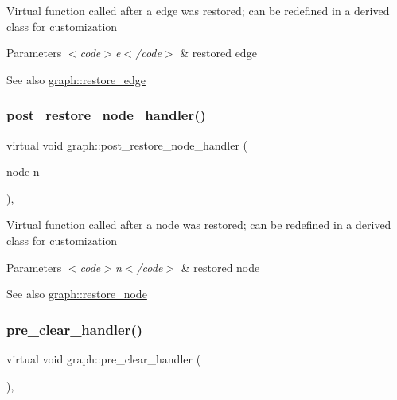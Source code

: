 Virtual function called after a edge was restored; can be redefined in a derived class for customization


\begin{DoxyParams}{Parameters}
{\em $<$code$>$e$<$/code$>$} & restored edge \\
\hline
\end{DoxyParams}
\begin{DoxySeeAlso}{See also}
\mbox{\hyperlink{classgraph_a2e5426682a0897b9f9104b019970bedc}{graph\+::restore\+\_\+edge}} 
\end{DoxySeeAlso}
\mbox{\label{classgraph_ad0fd5fc9618111890b596601b6273713}} 
\subsubsection{\texorpdfstring{post\+\_\+restore\+\_\+node\+\_\+handler()}{post\_restore\_node\_handler()}}
{\footnotesize\ttfamily virtual void graph\+::post\+\_\+restore\+\_\+node\+\_\+handler (\begin{DoxyParamCaption}\item[{\mbox{\hyperlink{classnode}{node}}}]{n }\end{DoxyParamCaption})\hspace{0.3cm}{\ttfamily [inline]}, {\ttfamily [virtual]}}

Virtual function called after a node was restored; can be redefined in a derived class for customization


\begin{DoxyParams}{Parameters}
{\em $<$code$>$n$<$/code$>$} & restored node \\
\hline
\end{DoxyParams}
\begin{DoxySeeAlso}{See also}
\mbox{\hyperlink{classgraph_ab57aab79e649cc275052b7decbdd03ec}{graph\+::restore\+\_\+node}} 
\end{DoxySeeAlso}
\mbox{\label{classgraph_a16ccad78837d16be59854549cd2d847a}} 
\subsubsection{\texorpdfstring{pre\+\_\+clear\+\_\+handler()}{pre\_clear\_handler()}}
{\footnotesize\ttfamily virtual void graph\+::pre\+\_\+clear\+\_\+handler (\begin{DoxyParamCaption}{ }\end{DoxyParamCaption})\hspace{0.3cm}{\ttfamily [inline]}, {\ttfamily [virtual]}}

